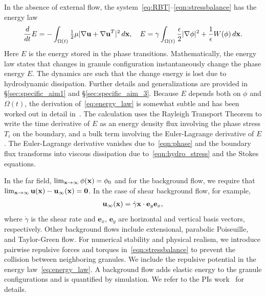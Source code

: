 In the absence of external flow, the
system~\eqref{eq:RBT}--\eqref{eqn:stressbalance} has the energy law
\begin{align}
\label{eq:energy_law}
  \frac{d}{dt}E
  = - \int_{\Omega(t)}\tfrac{1}{2}\mu|\nabla \mathbf{u} + \nabla
  \mathbf{u}^T|^2 \,d\mathbf{x},\quad
    E = \gamma \int_{\Omega(t)}
  \frac{\epsilon}{2} |\nabla \phi|^2 + \frac{1}{\epsilon} W(\phi) \,d\mathbf{x}.
\end{align}
Here $E$ is the energy stored in the phase transitions. Mathematically,
the energy law states that changes in granule configuration
instantaneously change the phase energy $E$. The dynamics are such that
the change energy is lost due to hydrodynamic dissipation. Further
details and generalizations are provided in \S\ref{sec:specific_aim1}
and \S\ref{sec:specific_aim_3}. Because $E$ depends both on $\phi$ and
$\Omega(t)$, the derivation of~\eqref{eq:energy_law} is somewhat subtle
and has been worked out in detail in~\cite{Fu2018_SIAM}. The
calculation uses the Rayleigh Transport Theorem to write the time
derivative of $E$ as an energy density flux involving the phase stress
$T_i$ on the boundary, and a bulk term involving the Euler-Lagrange
derivative of $E$. The Euler-Lagrange derivative vanishes due
to~\eqref{eqn:phase} and the boundary flux transforms into viscous
dissipation due to~\eqref{eqn:hydro_stress} and the Stokes equations. 


In the far field, $\lim_{\mathbf{x} \to \infty} \phi(\mathbf{x}) = \phi_0$ and for the
background flow, we require that $\lim_{\mathbf{x} \to \infty} \mathbf{u}(\mathbf{x}) -
\mathbf{u}_{\infty}(\mathbf{x}) = \mathbf{0}$. In the case of shear background flow,
for example,
\begin{align}
\label{eqn:shear_BG_flow}
\mathbf{u}_{\infty}(\mathbf{x}) = \dot{\gamma} \mathbf{x} \cdot \mathbf{e}_y \mathbf{e}_x,
\end{align}
where $\dot \gamma$ is the shear rate and $\mathbf{e}_x$, $\mathbf{e}_y$
are horizontal and vertical basis vectors, respectively. Other
background flows include extensional, parabolic Poiseuille, and
Taylor-Green flow. For numerical stability and physical realism, we
introduce pairwise repulsive forces and torques
in~\eqref{eqn:stressbalance} to prevent the collision between
neighboring granules. We include the repulsive potential in the energy
law~\eqref{eq:energy_law}. A background flow adds elastic energy to the
granule configurations and is quantified by simulation. We refer to the
PIs work~\cite{FuQuRyYo22, fu-ryh-qua-you2022, Fu2018_SIAM} for details. 

